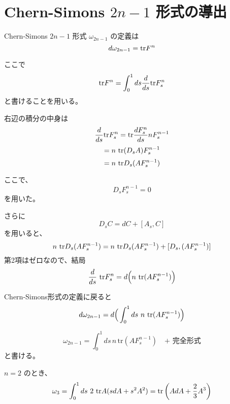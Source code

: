 \documentclass[uplatex]{jsarticle}
\begin{document}
\section{Chern-Simons $2n-1$ 形式の導出}

Chern-Simons $2n-1$ 形式 $\omega_{2n-1}$ の定義は
$$
	d \omega_{2n-1}
	=
	{\rm tr} F^{n}
$$

ここで
$$
	{\rm tr} F^{n}
	=
	\int^{1}_{0} ds \dfrac{d}{ds} {\rm tr} F^{n}_{s}
$$
と書けることを用いる。

右辺の積分の中身は
$$
	\dfrac{d}{ds} {\rm tr} F^{n}_{s}
		=
		{\rm tr}
	\dfrac{d F^{n}_{s}}{ds} n F^{n-1}_{s}
$$
$$
	=
	n
	\ {\rm tr}
	(D_{s} A) F^{n-1}_{s}
$$
$$
	=
	n
	\ {\rm tr}
	D_{s} (A F^{n-1}_{s})
$$

ここで、
$$
	D_{s} F^{n-1}_{s}
	=
	0
$$
を用いた。

さらに
$$
	D_{s} C = dC + [A_{s},C]
$$
を用いると、
$$
	n
	\ {\rm tr}
	D_{s} (A F^{n-1}_{s})
	=
	n
	\ {\rm tr}
	D_{s} (A F^{n-1}_{s})
	+
	[D_{s}, (A F^{n-1}_{s})]
$$
第2項はゼロなので、結局
$$
	\dfrac{d}{ds} \ {\rm tr} F^{n}_{s}
	=
	d
	\Big( n \ {\rm tr} (A F^{n-1}_{s}) \Big)
$$

Chern-Simons形式の定義に戻ると
$$
	d \omega_{2n-1}
	=
	d
	\Big( \int^{1}_{0} ds \ n \ {\rm tr} (A F^{n-1}_{s}) \Big)
$$


$$
	\omega_{2n-1} = \int_0^1 ds \, n \, \text{tr} (A F_s^{n-1}) \quad \text{+ 完全形式}
$$
と書ける。

$n=2$
のとき、
$$
	\omega_{3}
	=
	\int^{1}_{0} ds \ 2 \ {\rm tr} A (sdA + s^{2} A^{2})
	=
	{\rm tr} \left( AdA + \dfrac{2}{3} A^{3} \right)
$$
\end{document}
